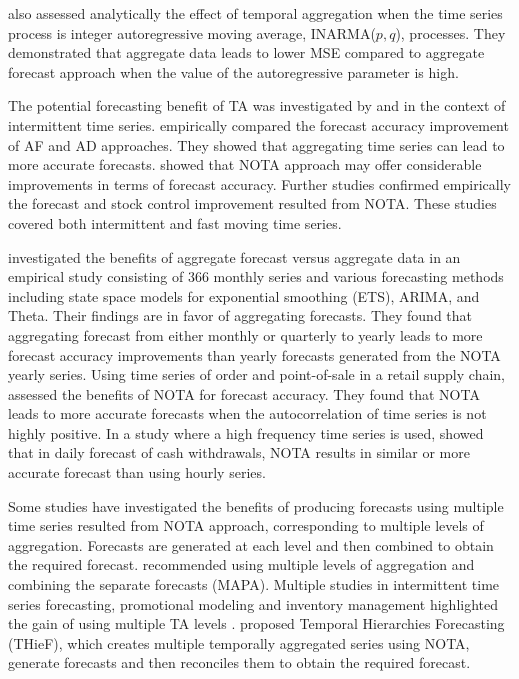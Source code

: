 \documentclass[preprint, 3p,
authoryear]{elsarticle} %
\begin{document}
\citet{mohammadipour2012forecast} also assessed analytically the effect
of temporal aggregation when the time series process is integer
autoregressive moving average, INARMA(\(p,q\)), processes. They
demonstrated that aggregate data leads to lower MSE compared to
aggregate forecast approach when the value of the autoregressive
parameter is high.

The potential forecasting benefit of TA was investigated by
\citet{willemain1994forecasting} and \citet{nikolopoulos2011aggregate}
in the context of intermittent time series.
\citet{willemain1994forecasting} empirically compared the forecast
accuracy improvement of AF and AD approaches. They showed that
aggregating time series can lead to more accurate forecasts.
\citet{nikolopoulos2011aggregate} showed that NOTA approach may offer
considerable improvements in terms of forecast accuracy. Further studies
\citep{babai2012impact, petropoulos2015forecast, kourentzes2014improving, spithourakis2011improving}
confirmed empirically the forecast and stock control improvement
resulted from NOTA. These studies covered both intermittent and fast
moving time series.

\citet{athanasopoulos2011tourism} investigated the benefits of aggregate
forecast versus aggregate data in an empirical study consisting of 366
monthly series and various forecasting methods including state space
models for exponential smoothing (ETS), ARIMA, and Theta. Their findings
are in favor of aggregating forecasts. They found that aggregating
forecast from either monthly or quarterly to yearly leads to more
forecast accuracy improvements than yearly forecasts generated from the
NOTA yearly series. Using time series of order and point-of-sale in a
retail supply chain, \citet{jin2015forecasting} assessed the benefits of
NOTA for forecast accuracy. They found that NOTA leads to more accurate
forecasts when the autocorrelation of time series is not highly
positive. In a study where a high frequency time series is used,
\citet{luna2011top} showed that in daily forecast of cash withdrawals,
NOTA results in similar or more accurate forecast than using hourly
series.

Some studies have investigated the benefits of producing forecasts using
multiple time series resulted from NOTA approach, corresponding to
multiple levels of aggregation. Forecasts are generated at each level
and then combined to obtain the required forecast.
\citet{kourentzes2014improving} recommended using multiple levels of
aggregation and combining the separate forecasts (MAPA). Multiple
studies in intermittent time series forecasting, promotional modeling
and inventory management highlighted the gain of using multiple TA
levels
\citep{petropoulos2014forecast, kourentzes2015forecasting, barrow2016distributions}.
\citet{athanasopoulos2017forecasting} proposed Temporal Hierarchies
Forecasting (THieF), which creates multiple temporally aggregated series
using NOTA, generate forecasts and then reconciles them to obtain the
required forecast.
\end{document}
